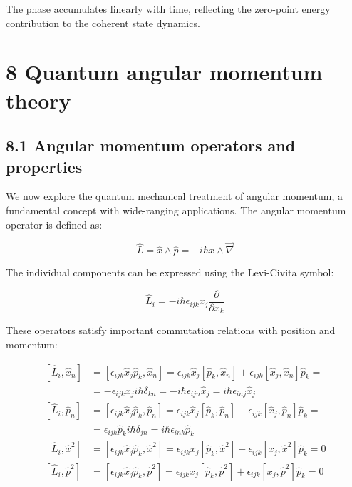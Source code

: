 \documentclass[10pt]{article}
\begin{document}
The phase accumulates linearly with time, reflecting the zero-point energy contribution to the coherent state dynamics.

\section*{8 Quantum angular momentum theory}
\subsection*{8.1 Angular momentum operators and properties}
We now explore the quantum mechanical treatment of angular momentum, a fundamental concept with wide-ranging applications. The angular momentum operator is defined as:

\begin{equation*}
\hat{L}=\hat{x} \wedge \hat{p}=-i \hbar x \wedge \vec{\nabla} \tag{8.1}
\end{equation*}

The individual components can be expressed using the Levi-Civita symbol:

\begin{equation*}
\hat{L}_{i}=-i \hbar \epsilon_{i j k} x_{j} \frac{\partial}{\partial x_{k}} \tag{8.2}
\end{equation*}

These operators satisfy important commutation relations with position and momentum:

\begin{align*}
{\left[\hat{L}_{i}, \hat{x}_{n}\right] } & =\left[\epsilon_{i j k} \hat{x}_{j} \hat{p}_{k}, \hat{x}_{n}\right]=\epsilon_{i j k} \hat{x}_{j}\left[\hat{p}_{k}, \hat{x}_{n}\right]+\epsilon_{i j k}\left[\hat{x}_{j}, \hat{x}_{n}\right] \hat{p}_{k}= \\
& =-\epsilon_{i j k} x_{j} i \hbar \delta_{k n}=-i \hbar \epsilon_{i j n} \hat{x}_{j}=i \hbar \epsilon_{i n j} \hat{x}_{j}  \tag{8.3}\\
{\left[\hat{L}_{i}, \hat{p}_{n}\right] } & =\left[\epsilon_{i j k} \hat{x}_{j} \hat{p}_{k}, \hat{p}_{n}\right]=\epsilon_{i j k} \hat{x}_{j}\left[\hat{p}_{k}, \hat{p}_{n}\right]+\epsilon_{i j k}\left[\hat{x}_{j}, \hat{p}_{n}\right] \hat{p}_{k}= \\
& =\epsilon_{i j k} \hat{p}_{k} i \hbar \delta_{j n}=i \hbar \epsilon_{i n k} \hat{p}_{k}  \tag{8.4}\\
{\left[\hat{L}_{i}, \hat{x}^{2}\right] } & =\left[\epsilon_{i j k} \hat{x}_{j} \hat{p}_{k}, \hat{x}^{2}\right]=\epsilon_{i j k} x_{j}\left[\hat{p}_{k}, \hat{x}^{2}\right]+\epsilon_{i j k}\left[x_{j}, \hat{x}^{2}\right] \hat{p}_{k}=0  \tag{8.5}\\
{\left[\hat{L}_{i}, \hat{p}^{2}\right] } & =\left[\epsilon_{i j k} \hat{x}_{j} \hat{p}_{k}, \hat{p}^{2}\right]=\epsilon_{i j k} x_{j}\left[\hat{p}_{k}, \hat{p}^{2}\right]+\epsilon_{i j k}\left[x_{j}, \hat{p}^{2}\right] \hat{p}_{k}=0 \tag{8.6}
\end{align*}
\end{document}
